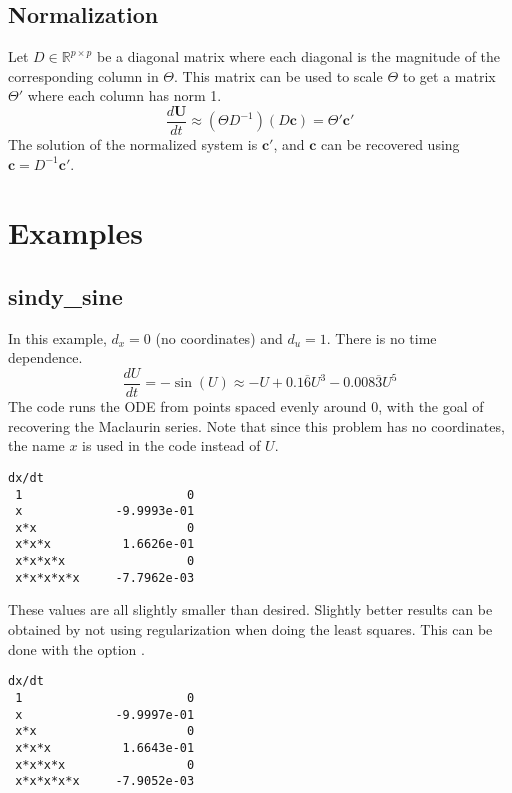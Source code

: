 \documentclass{article}
\let\vec\mathbf
\def\real{\mathbb{R}}
\def\lstinline#1{}%
\begin{document}
\subsection{Normalization}

Let $D \in \real^{p \times p}$ be a diagonal matrix where each diagonal is the magnitude of the
corresponding column in $\Theta$. This matrix can be used to scale $\Theta$ to
get a matrix $\Theta'$ where each column has norm 1.
\begin{equation}\label{eq:normalized-system}
\frac{d\vec{U}}{dt} \approx (\Theta D^{-1}) (D\vec{c}) = \Theta' \vec{c'}
\end{equation}
The solution of the normalized system is $\vec{c'}$, and $\vec{c}$ can be
recovered using $\vec{c} = D^{-1} \vec{c'}$.

\section{Examples}

\subsection{sindy\_sine}
In this example, $d_x = 0$ (no coordinates) and $d_u = 1$. There is no time dependence.
\begin{equation*}
\frac{dU}{dt} = -\sin(U) \approx -U + 0.1\overline{6}U^3 - 0.008\overline{3}U^5
\end{equation*}
The code runs the ODE from points spaced evenly around 0, with the goal of
recovering the Maclaurin series. Note that since this problem has no
coordinates, the name $x$ is used in the code instead of $U$.
\begin{lstlisting}[language={}]
                    dx/dt
 1                       0
 x             -9.9993e-01
 x*x                     0
 x*x*x          1.6626e-01
 x*x*x*x                 0
 x*x*x*x*x     -7.7962e-03
\end{lstlisting}
These values are all slightly smaller than desired. Slightly better results can
be obtained by not using regularization when doing the least squares. This can
be done with the option \lstinline{-tao_brgn_regularizer_weight 0}.
\begin{lstlisting}[language={}]
                    dx/dt
 1                       0
 x             -9.9997e-01
 x*x                     0
 x*x*x          1.6643e-01
 x*x*x*x                 0
 x*x*x*x*x     -7.9052e-03
\end{lstlisting}
\end{document}
